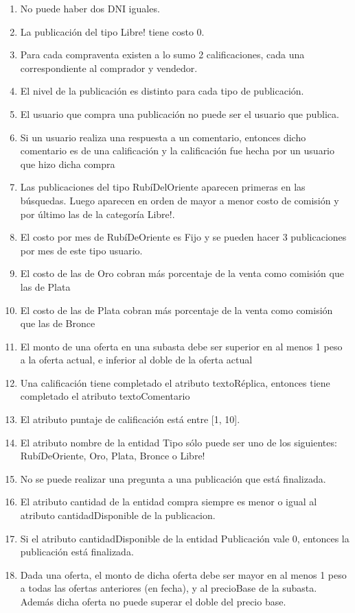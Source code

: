 \documentclass[a4paper, 10pt, twoside]{article}
\begin{document}
\begin{enumerate}
\item No puede haber dos DNI iguales. 
\item La publicaci\'on del tipo Libre! tiene costo 0.
\item Para cada compraventa existen a lo sumo 2 calificaciones, cada una correspondiente al comprador y vendedor.
\item El nivel de la publicaci\'on es distinto para cada tipo de publicaci\'on.
\item El usuario que compra una publicaci\'on no puede ser el usuario que publica.
\item Si un usuario realiza una respuesta a un comentario, entonces dicho comentario es de una calificaci\'on y la calificaci\'on fue hecha por un usuario que hizo dicha  compra 
\item Las publicaciones del tipo Rub\'iDelOriente aparecen primeras en las b\'usquedas. Luego aparecen en orden de mayor a menor costo de comisi\'on y por \'ultimo las de la categor\'ia Libre!.
\item El costo por mes de Rub\'iDeOriente es Fijo y se pueden hacer 3 publicaciones por mes de este tipo usuario.
\item El costo de las de Oro cobran m\'as porcentaje de la venta como comisi\'on que las de Plata
\item El costo de las de Plata cobran m\'as porcentaje de la venta como comisi\'on que las de Bronce 
\item El monto de una oferta en una subasta debe ser superior en al menos 1 peso a la oferta actual, e inferior al doble de la oferta actual
\item Una calificaci\'on tiene completado el atributo textoR\'eplica, entonces tiene completado el atributo textoComentario
\item El atributo puntaje de calificaci\'on est\'a entre [1, 10].
\item El atributo nombre de la entidad Tipo s\'olo puede ser uno de los siguientes: Rub\'iDeOriente,  Oro,  Plata,  Bronce o Libre! 
\item No se puede realizar una pregunta a una publicaci\'on que est\'a finalizada.
\item El atributo cantidad de la entidad compra siempre es menor o igual al atributo cantidadDisponible de la publicacion.
\item Si el atributo cantidadDisponible de la entidad Publicaci\'on vale 0, entonces la publicaci\'on est\'a finalizada. 
\item Dada una oferta, el monto de dicha oferta debe ser mayor en al menos 1 peso a todas las ofertas anteriores (en fecha), y al precioBase de la subasta. Adem\'as dicha oferta no puede superar el doble del precio base.

\end{enumerate}
\end{document}
